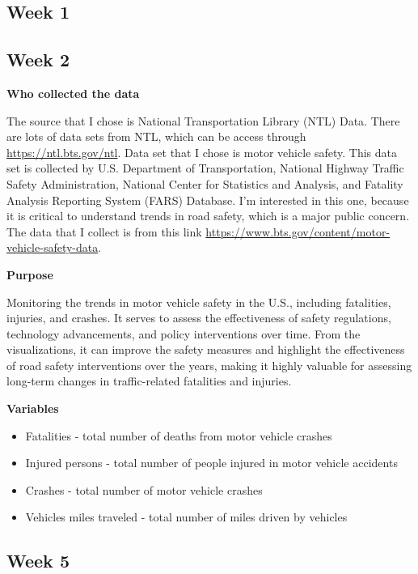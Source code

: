 \documentclass[
  letterpaper,
  DIV=11,
  numbers=noendperiod]{scrreprt}
\begin{document}
\subsection{Week 1}\label{week-1-1}

\subsection{Week 2}\label{week-2-1}

\textbf{Who collected the data}

The source that I chose is National Transportation Library (NTL) Data.
There are lots of data sets from NTL, which can be access through
\url{https://ntl.bts.gov/ntl}. Data set that I chose is motor vehicle
safety. This data set is collected by U.S. Department of Transportation,
National Highway Traffic Safety Administration, National Center for
Statistics and Analysis, and Fatality Analysis Reporting System (FARS)
Database. I'm interested in this one, because it is critical to
understand trends in road safety, which is a major public concern. The
data that I collect is from this link
\url{https://www.bts.gov/content/motor-vehicle-safety-data}.

\textbf{Purpose}

Monitoring the trends in motor vehicle safety in the U.S., including
fatalities, injuries, and crashes. It serves to assess the effectiveness
of safety regulations, technology advancements, and policy interventions
over time. From the visualizations, it can improve the safety measures
and highlight the effectiveness of road safety interventions over the
years, making it highly valuable for assessing long-term changes in
traffic-related fatalities and injuries.

\textbf{Variables}

\begin{itemize}
\item
  Fatalities - total number of deaths from motor vehicle crashes
\item
  Injured persons - total number of people injured in motor vehicle
  accidents
\item
  Crashes - total number of motor vehicle crashes
\item
  Vehicles miles traveled - total number of miles driven by vehicles
\end{itemize}

\subsection{Week 5}\label{week-5}
\end{document}
